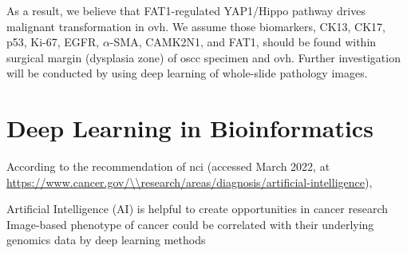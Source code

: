 \documentclass[12pt, a4paper]{article}
\begin{document}
As a result, we believe that FAT1-regulated YAP1/Hippo pathway drives malignant transformation in \acrshort{ovh}.
We assume those biomarkers, CK13, CK17, p53, Ki-67, EGFR, $\alpha$-SMA, CAMK2N1, and FAT1, should be found within surgical margin (dysplasia zone) of \acrshort{oscc} specimen and \acrshort{ovh}.
Further investigation will be conducted by using deep learning of whole-slide pathology images.





\clearpage

\section{Deep Learning in Bioinformatics}

According to the recommendation of \acrfull{nci} (accessed March 2022, at \url{https://www.cancer.gov/\\research/areas/diagnosis/artificial-intelligence}), 
\begin{outline}
\1 Artificial Intelligence (AI) is helpful to create opportunities in cancer research
\1 Image-based phenotype of cancer could be correlated with their underlying genomics data by deep learning methods
\end{outline}
\end{document}
